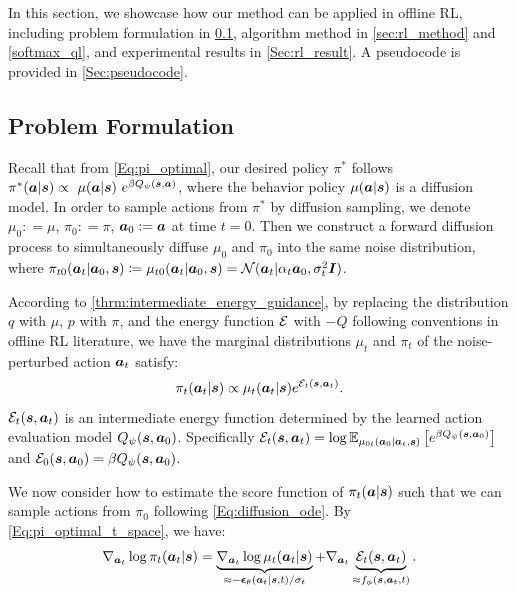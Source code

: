 In this section, we showcase how our method can be applied in offline RL, including problem formulation in \cref{sec:rl_formulation}, algorithm method in \cref{sec:rl_method} and \cref{softmax_ql}, and experimental results in \cref{Sec:rl_result}. A pseudocode is provided in \cref{Sec:pseudocode}.
\subsection{Problem Formulation}
\label{sec:rl_formulation}
Recall that from \eqref{Eq:pi_optimal}, our desired policy $\pi^*$ follows $\pi^*({\bm{a}}|{\bm{s}}) \propto \ \mu({\bm{a}}|{\bm{s}}) \ e^{\beta Q_\psi({\bm{s}}, {\bm{a}})}$, where the behavior policy $\mu({\bm{a}}|{\bm{s}})$ is a diffusion model.
In order to sample actions from $\pi^*$ by diffusion sampling, we denote $\mu_0 : = \mu$, $\pi_0 : = \pi$, ${\bm{a}}_0:={\bm{a}}$ at time $t=0$. Then we construct a forward diffusion process to simultaneously diffuse $\mu_0$ and $\pi_0$ into the same noise distribution, where $\pi_{t0}({\bm{a}}_t|{\bm{a}}_0, {\bm{s}}) \coloneqq \mu_{t0}({\bm{a}}_t|{\bm{a}}_0, {\bm{s}}) = {\mathcal{N}}({\bm{a}}_t|\alpha_t{\bm{a}}_0,\sigma_t^2{\bm{I}})$. 

According to \cref{thrm:intermediate_energy_guidance}, by replacing the distribution $q$ with $\mu$, $p$ with $\pi$, and the energy function ${\mathcal{E}}$ with $-Q$ following conventions in offline RL literature, we have the marginal distributions $\mu_t$ and $\pi_t$ of the noise-perturbed action ${\bm{a}}_t$ satisfy:
\begin{equation}
    \label{Eq:pi_optimal_t_space}
    \pi_t({\bm{a}}_t|{\bm{s}}) \propto \mu_t({\bm{a}}_t|{\bm{s}}) e^{{\mathcal{E}}_t({\bm{s}}, {\bm{a}}_t)}.
\end{equation}
${\mathcal{E}}_t({\bm{s}}, {\bm{a}}_t)$ is an intermediate energy function determined by the learned action evaluation model $Q_\psi({\bm{s}}, {\bm{a}}_0)$. Specifically ${\mathcal{E}}_t({\bm{s}}, {\bm{a}}_t) = \log \mathbb{E}_{\mu_{0t}({\bm{a}}_0|{\bm{a}}_t, {\bm{s}})}\left[e^{\beta Q_\psi({\bm{s}}, {\bm{a}}_0)}\right]$ and ${\mathcal{E}}_0({\bm{s}}, {\bm{a}}_0)=\beta Q_\psi({\bm{s}}, {\bm{a}}_0)$.

We now consider how to estimate the score function of $\pi_t({\bm{a}}|{\bm{s}})$ such that we can sample actions from $\pi_0$ following \eqref{Eq:diffusion_ode}. By \eqref{Eq:pi_optimal_t_space}, we have:
\begin{equation}
\label{Eq:rl_energy_guidance}
    \nabla_{{\bm{a}}_t}\log \pi_t({\bm{a}}_t|{\bm{s}}) = \underbrace{\nabla_{{\bm{a}}_t}\log \mu_t({\bm{a}}_t|{\bm{s}})}_{\approx -\bm{\epsilon}_\theta({\bm{a}}_t|{\bm{s}},t)/\sigma_t}
    + \nabla_{{\bm{a}}_t}\underbrace{{\mathcal{E}}_t({\bm{s}}, {\bm{a}}_t)}_{\approx f_\phi({\bm{s}}, {\bm{a}}_t, t)}.
\end{equation}


